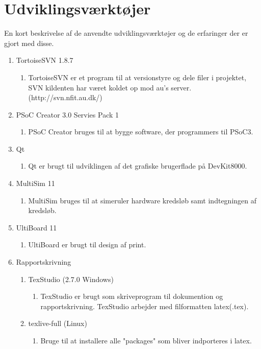 \section{Udviklingsværktøjer}
En kort beskrivelse af de anvendte udviklingsværktøjer og de erfaringer der er
gjort med disse.

\begin{enumerate}
	\item TortoiseSVN 1.8.7
			\begin{enumerate}
				\item TortoiseSVN er et program til at versionstyre og dele filer i projektet, SVN kildenten har været koldet op mod au's server. (http://svn.nfit.au.dk/)
			\end{enumerate}
	\item PSoC Creator 3.0 Servies Pack 1
		\begin{enumerate}
			\item PSoC Creator bruges til at bygge software, der programmers til PSoC3.
		\end{enumerate}
	\item Qt
		\begin{enumerate}
			\item Qt er brugt til udviklingen af det grafiske brugerflade på DevKit8000.
		\end{enumerate}
	\item MultiSim 11
		\begin{enumerate}
			\item MultiSim bruges til at simeruler hardware kredsløb samt indtegningen af kredsløb.
		\end{enumerate}
	\item UltiBoard 11
		\begin{enumerate}
			\item UltiBoard er brugt til design af print.
				\end{enumerate}
	\item Rapportskrivning
	\begin{enumerate}
		\item TexStudio (2.7.0 Windows)
			\begin{enumerate}
				\item TexStudio er brugt som skriveprogram til dokumention og rapportskrivning. TexStudio arbejder med filformatten latex(.tex).
			\end{enumerate}
		\item texlive-full (Linux)
			\begin{enumerate}
				\item Bruge til at installere alle "packages" som bliver indporteres i latex.

\end{enumerate}
\end{enumerate}
\end{enumerate}
